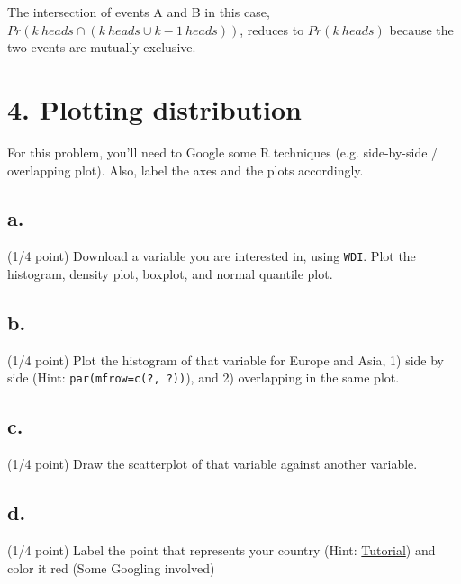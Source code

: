 \documentclass{article}\usepackage[]{graphicx}\usepackage[]{color}
\begin{document}
The intersection of events A and B in this case, $Pr (k\ heads \cap (k\ heads \cup k-1\ heads))$, reduces to $Pr(k\ heads)$ because the two events are mutually exclusive.

\section*{4. Plotting distribution}

For this problem, you'll need to Google some R techniques (e.g. side-by-side / overlapping plot). Also, label the axes and the plots accordingly.

\subsection*{a.} (1/4 point) Download a variable you are interested in, using \verb`WDI`. Plot the histogram, density plot, boxplot, and normal quantile plot.

\subsection*{b.} (1/4 point) Plot the histogram of that variable for Europe and Asia, 1) side by side (Hint: \verb`par(mfrow=c(?, ?))`), and 2) overlapping in the same plot.

\subsection*{c.} (1/4 point) Draw the scatterplot of that variable against another variable.

\subsection*{d.} (1/4 point) Label the point that represents your country (Hint: \href{https://chemicalstatistician.wordpress.com/2013/03/02/adding-labels-to-points-in-a-scatter-plot-in-r/}{Tutorial}) and color it red (Some Googling involved)
\end{document}
